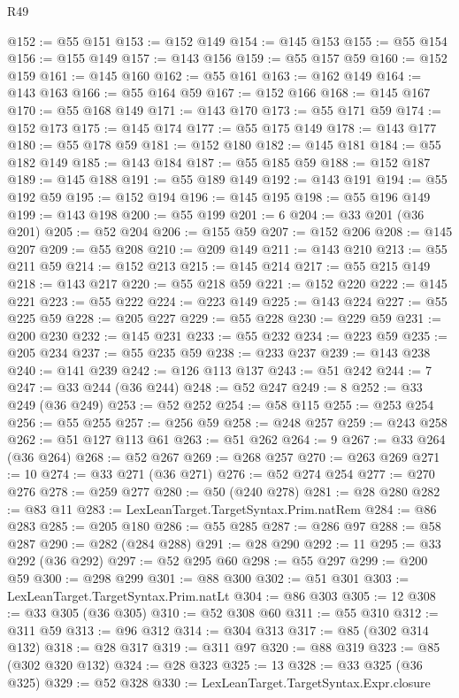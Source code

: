 \begin{lexlean}{R49}
\begin{coremodule}
@152 := @55 @151
@153 := @152 @149
@154 := @145 @153
@155 := @55 @154
@156 := @155 @149
@157 := @143 @156
@159 := @55 @157 @59
@160 := @152 @159
@161 := @145 @160
@162 := @55 @161
@163 := @162 @149
@164 := @143 @163
@166 := @55 @164 @59
@167 := @152 @166
@168 := @145 @167
@170 := @55 @168 @149
@171 := @143 @170
@173 := @55 @171 @59
@174 := @152 @173
@175 := @145 @174
@177 := @55 @175 @149
@178 := @143 @177
@180 := @55 @178 @59
@181 := @152 @180
@182 := @145 @181
@184 := @55 @182 @149
@185 := @143 @184
@187 := @55 @185 @59
@188 := @152 @187
@189 := @145 @188
@191 := @55 @189 @149
@192 := @143 @191
@194 := @55 @192 @59
@195 := @152 @194
@196 := @145 @195
@198 := @55 @196 @149
@199 := @143 @198
@200 := @55 @199
@201 := 6
@204 := @33 @201 (@36 @201)
@205 := @52 @204
@206 := @155 @59
@207 := @152 @206
@208 := @145 @207
@209 := @55 @208
@210 := @209 @149
@211 := @143 @210
@213 := @55 @211 @59
@214 := @152 @213
@215 := @145 @214
@217 := @55 @215 @149
@218 := @143 @217
@220 := @55 @218 @59
@221 := @152 @220
@222 := @145 @221
@223 := @55 @222
@224 := @223 @149
@225 := @143 @224
@227 := @55 @225 @59
@228 := @205 @227
@229 := @55 @228
@230 := @229 @59
@231 := @200 @230
@232 := @145 @231
@233 := @55 @232
@234 := @223 @59
@235 := @205 @234
@237 := @55 @235 @59
@238 := @233 @237
@239 := @143 @238
@240 := @141 @239
@242 := @126 @113 @137
@243 := @51 @242
@244 := 7
@247 := @33 @244 (@36 @244)
@248 := @52 @247
@249 := 8
@252 := @33 @249 (@36 @249)
@253 := @52 @252
@254 := @58 @115
@255 := @253 @254
@256 := @55 @255
@257 := @256 @59
@258 := @248 @257
@259 := @243 @258
@262 := @51 @127 @113 @61
@263 := @51 @262
@264 := 9
@267 := @33 @264 (@36 @264)
@268 := @52 @267
@269 := @268 @257
@270 := @263 @269
@271 := 10
@274 := @33 @271 (@36 @271)
@276 := @52 @274 @254
@277 := @270 @276
@278 := @259 @277
@280 := @50 (@240 @278)
@281 := @28 @280
@282 := @83 @11
@283 := LexLeanTarget.TargetSyntax.Prim.natRem
@284 := @86 @283
@285 := @205 @180
@286 := @55 @285
@287 := @286 @97
@288 := @58 @287
@290 := @282 (@284 @288)
@291 := @28 @290
@292 := 11
@295 := @33 @292 (@36 @292)
@297 := @52 @295 @60
@298 := @55 @297
@299 := @200 @59
@300 := @298 @299
@301 := @88 @300
@302 := @51 @301
@303 := LexLeanTarget.TargetSyntax.Prim.natLt
@304 := @86 @303
@305 := 12
@308 := @33 @305 (@36 @305)
@310 := @52 @308 @60
@311 := @55 @310
@312 := @311 @59
@313 := @96 @312
@314 := @304 @313
@317 := @85 (@302 @314 @132)
@318 := @28 @317
@319 := @311 @97
@320 := @88 @319
@323 := @85 (@302 @320 @132)
@324 := @28 @323
@325 := 13
@328 := @33 @325 (@36 @325)
@329 := @52 @328
@330 := LexLeanTarget.TargetSyntax.Expr.closure

\end{coremodule}
\end{lexlean}
